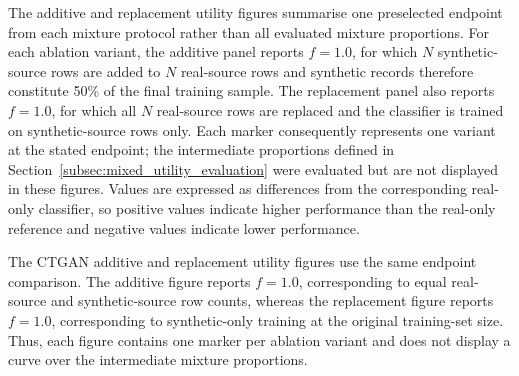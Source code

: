 The additive and replacement utility figures summarise one preselected endpoint from each mixture protocol rather than all evaluated mixture proportions. For each ablation variant, the additive panel reports $f=1.0$, for which $N$ synthetic-source rows are added to $N$ real-source rows and synthetic records therefore constitute 50\% of the final training sample. The replacement panel also reports $f=1.0$, for which all $N$ real-source rows are replaced and the classifier is trained on synthetic-source rows only. Each marker consequently represents one variant at the stated endpoint; the intermediate proportions defined in Section~\ref{subsec:mixed_utility_evaluation} were evaluated but are not displayed in these figures. Values are expressed as differences from the corresponding real-only classifier, so positive values indicate higher performance than the real-only reference and negative values indicate lower performance.

\caption{Downstream utility of the CTAB-GAN+ ablation variants at the additive endpoint $f=1.0$. At this endpoint, $N$ synthetic-source rows are added to $N$ real-source rows, so the final training sample is 50\% synthetic. One marker is shown per variant. The panels report differences in AP (PR), macro F1, and positive-class recall relative to the real-only reference.}

\caption{Downstream utility of the CTAB-GAN+ ablation variants at the replacement endpoint $f=1.0$. At this endpoint, all $N$ training rows are synthetic-source rows. One marker is shown per variant. The panels report differences in AP (PR), macro F1, and positive-class recall relative to the real-only reference.}

The CTGAN additive and replacement utility figures use the same endpoint comparison. The additive figure reports $f=1.0$, corresponding to equal real-source and synthetic-source row counts, whereas the replacement figure reports $f=1.0$, corresponding to synthetic-only training at the original training-set size. Thus, each figure contains one marker per ablation variant and does not display a curve over the intermediate mixture proportions.

